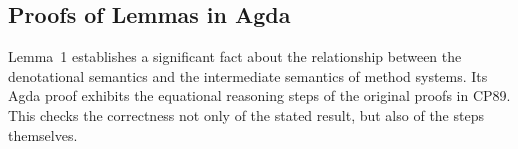 \begin{AgdaAlign}
\begin{code}
\AgdaSymbol{;}\AgdaSpace{}%
\AgdaSymbol{;}\AgdaSpace{}%
\AgdaSymbol{)}\<%
\\
%
\>[2]\AgdaSpace{}%
\AgdaSpace{}%
\<%
\\
%
\>[2]\AgdaSpace{}%
\AgdaSpace{}%
\<%
\\
%
\>[2]\AgdaSpace{}%
\<%
\\
%
\>[2]\AgdaSpace{}%
\AgdaSpace{}%
\<%
\\
\>[2][@{}l@{\AgdaIndent{0}}]%
\>[4]\AgdaSpace{}%
\AgdaSymbol{(}\AgdaSymbol{)}\<%
\\
%
\>[2]\AgdaSpace{}%
\AgdaSpace{}%
\<%
\\
\>[2][@{}l@{\AgdaIndent{0}}]%
\>[4]\AgdaSpace{}%
\AgdaSymbol{(}\AgdaSpace{}%
\AgdaSpace{}%
\AgdaSymbol{)}\AgdaSpace{}%
\AgdaSpace{}%
\AgdaSymbol{(}\AgdaSymbol{)}\<%
\\
%
\\[\AgdaEmptyExtraSkip]%
%
\>[2]\AgdaSpace{}%
\AgdaModule{\AgdaUnderscore{}}\AgdaSpace{}%
\AgdaSymbol{(}\AgdaSpace{}%
\AgdaSpace{}%
\AgdaSymbol{:}\AgdaSpace{}%
\AgdaSpace{}%
\AgdaSpace{}%
\AgdaSpace{}%
\AgdaSymbol{)}\<%
\\
\>[2][@{}l@{\AgdaIndent{0}}]%
\>[4]\<%
\end{code}

\subsection{Proofs of Lemmas in Agda}

Lemma~1 establishes a significant fact about the relationship
between the denotational semantics and the intermediate semantics of method systems.
Its Agda proof exhibits the equational reasoning steps of the original proofs in CP89.
This checks the correctness not only of the stated result, but also of the steps themselves.


\end{AgdaAlign}
